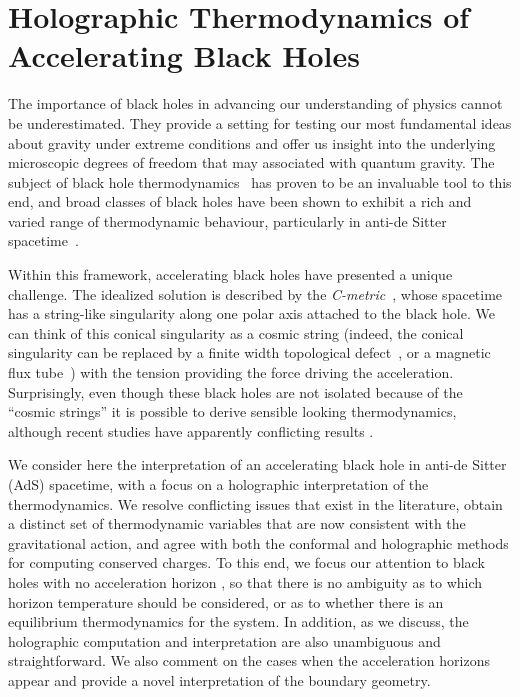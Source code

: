 \documentclass[
twoside,
openright,
frontopenright
]{dmathesis}
\begin{document}
\chapter{Holographic Thermodynamics of Accelerating Black Holes}
\label{chap:holoTD}

The importance of black holes in advancing our understanding of physics cannot
be underestimated.  They provide a setting for testing our most fundamental
ideas about gravity under extreme conditions and offer us insight into the
underlying microscopic degrees of freedom that may associated with quantum
gravity.  The subject of black hole thermodynamics~\cite{Bekenstein:1973ur,
  Bekenstein:1974ax,Hawking:1974sw} has proven to be an invaluable tool to this
end, and broad classes of black holes have been shown to exhibit a rich and
varied range of thermodynamic behaviour, particularly in anti-de Sitter
spacetime~\cite{Kubiznak:2016qmn}.

Within this framework, accelerating black holes have presented a unique
challenge.  The idealized solution is described by the
\emph{C-metric}~\cite{Kinnersley:1970zw,
  Plebanski:1976gy,Dias:2002mi,Griffiths:2005qp}, whose spacetime has a
string-like singularity along one polar axis attached to the black hole.  We can
think of this conical singularity as a cosmic string (indeed, the conical
singularity can be replaced by a finite width topological
defect~\cite{Gregory:1995hd}, or a magnetic flux tube~\cite{Dowker:1993bt}) with
the tension providing the force driving the acceleration.  Surprisingly, even
though these black holes are not isolated because of the ``cosmic strings'' it
is possible to derive sensible looking thermodynamics, although recent studies
have apparently conflicting results
\cite{Appels:2016uha,Appels:2017xoe,Gregory:2017ogk,Astorino:2016ybm}.

We consider here the interpretation of an accelerating black hole in anti-de
Sitter (AdS) spacetime, with a focus on a holographic interpretation of the
thermodynamics. We resolve conflicting issues that exist in the literature,
obtain a distinct set of thermodynamic variables that are now consistent with
the gravitational action, and agree with both the conformal and holographic
methods for computing conserved charges. To this end, we focus our attention to
black holes with no acceleration horizon \cite{Podolsky:2002nk}, so that there
is no ambiguity as to which horizon temperature should be considered, or as to
whether there is an equilibrium thermodynamics for the system. In addition, as
we discuss, the holographic computation and interpretation are also unambiguous
and straightforward. We also comment on the cases when the acceleration horizons
appear and provide a novel interpretation of the boundary geometry.
\end{document}
